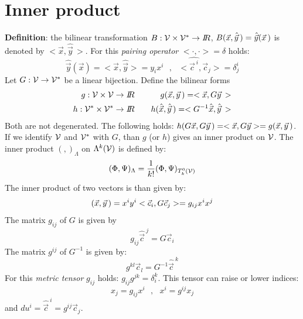 \documentclass[twoside]{report}
\begin{document}
\section{Inner product}
{\bf Definition}: the bilinear transformation $B:{\cal V}\times{\cal V}^*\rightarrow I\hspace{-1mm}R$,
$B(\vec{x},\hat{\vec{y}}\,)=\hat{\vec{y}}(\vec{x}\,)$ is denoted by
$<\vec{x},\hat{\vec{y}}\,>$.
For this {\it pairing operator} $<\cdot,\cdot>=\delta$ holds:
\[
\hat{\vec{y}}(\vec{x})=<\vec{x},\hat{\vec{y}}>=y_ix^i~~~,~~~<\hat{\vec{c}^{~i}},\vec{c}_j>=\delta_j^i
\]
Let $G:{\cal V}\rightarrow{\cal V}^*$ be a linear bijection. Define the
bilinear forms
\begin{eqnarray*}
g:{\cal V\times V}\rightarrow I\hspace{-1mm}R&~~~&g(\vec{x},\vec{y}\,)=<\vec{x},G\vec{y}\,>\\
h:{\cal V^*\times V^*}\rightarrow I\hspace{-1mm}R&~~~&h(\hat{\vec{x}},\hat{\vec{y}}\,)=<G^{-1}\hat{\vec{x}},\hat{\vec{y}}\,>
\end{eqnarray*}
Both are not degenerated. The following holds: $h(G\vec{x},G\vec{y}\,)=<\vec{x},G\vec{y}>=g(\vec{x},\vec{y}\,)$.
If we identify $\cal V$ and $\cal V^*$ with $G$, than $g$ (or $h$)
gives an inner product on $\cal V$.
\npar
The inner product $(,)_\Lambda$ on $\Lambda^k(\cal V)$ is defined by:
\[
(\Phi,\Psi)_\Lambda=\frac{1}{k!}(\Phi,\Psi)_{T^0_k(\cal V)}
\]
The inner product of two vectors is than given by:
\[
(\vec{x},\vec{y}\,)=x^iy^i<\vec{c}_i,G\vec{c}_j>=g_{ij}x^ix^j
\]
The matrix $g_{ij}$ of $G$ is given by
\[
g_{ij}\hat{\vec{c}}^{~j}=G\vec{c}_i
\]
The matrix $g^{ij}$ of $G^{-1}$ is given by:
\[
g^{kl}\vec{c}_l=G^{-1}\hat{\vec{c}}^{~k}
\]
For this {\it metric tensor} $g_{ij}$ holds: $g_{ij}g^{jk}=\delta_i^k$.
This tensor can raise or lower indices:
\[
x_j=g_{ij}x^i~~~,~~~x^i=g^{ij}x_j
\]
and $du^i=\hat{\vec{c}}^{~i}=g^{ij}\vec{c}_j$.
\npar
\end{document}
